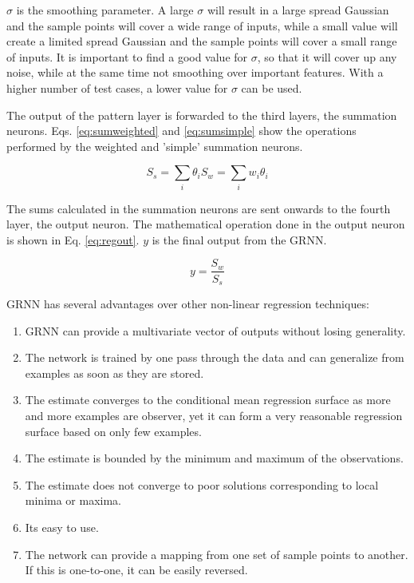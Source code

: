 \documentclass[12pt]{article}
\begin{document}
		$\sigma$ is the smoothing parameter. A large $\sigma$ will result in a large spread Gaussian and the sample points will cover a wide range of inputs, while a small value will create a limited spread Gaussian and the sample points will cover a small range of inputs. It is important to find a good value for $\sigma$, so that it will cover up any noise, while at the same time not smoothing over important features. With a higher number of test cases, a lower value for $\sigma$ can be used. 
		
		The output of the pattern layer is forwarded to the third layers, the summation neurons. Eqs. \ref{eq:sumweighted} and \ref{eq:sumsimple} show the operations performed by the weighted and 'simple' summation neurons.
		
		\begin{subequations}
			\begin{equation}
				\label{eq:sumweighted}
				S_{s} = \sum_{i} \theta_{i}
			\end{equation}
			\begin{equation}
				\label{eq:sumsimple}
				S_{w} = \sum_{i} w_{i}\theta_{i}
			\end{equation}
		\end{subequations}
		
		The sums calculated in the summation neurons are sent onwards to the fourth layer, the output neuron. The mathematical operation done in the output neuron is shown in Eq. \ref{eq:regout}. $y$ is the final output from the GRNN. 
		
		\begin{equation}
			\label{eq:regout}
			y = \frac{S_{w}}{S_{s}}
		\end{equation}
		
		GRNN has several advantages over other non-linear regression techniques\cite{grnn}: 
		\begin{enumerate}
			\item GRNN can provide a multivariate vector of outputs without losing generality. 
			\item The network is trained by one pass through the data and can generalize from examples as soon as they are stored.
			\item The estimate converges to the conditional mean regression surface as more and more examples are observer, yet it can form a very reasonable regression surface based on only few examples.
			\item The estimate is bounded by the minimum and maximum of the observations.
			\item The estimate does not converge to poor solutions corresponding to local minima or maxima. 
			\item Its easy to use.
			\item The network can provide a mapping from one set of sample points to another. If this is one-to-one, it can be easily reversed. 
		\end{enumerate}
		
\end{document}
